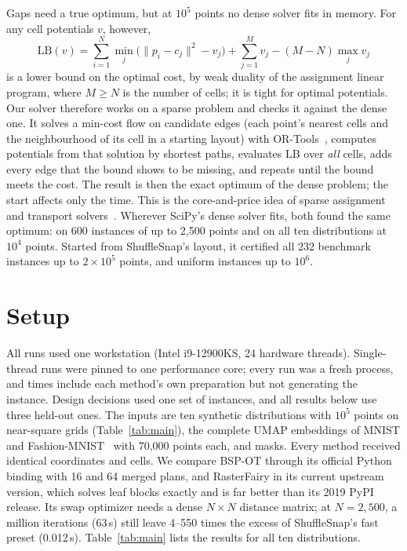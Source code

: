 \documentclass[11pt]{article}
\newcommand{\ShuffleSnap}{ShuffleSnap}
\begin{document}
Gaps need a true optimum, but at $10^5$ points no dense solver fits in memory. For any cell potentials $v$, however,
\[
  \mathrm{LB}(v)=\sum_{i=1}^N \min_j\bigl(\lVert p_i-c_j\rVert^2-v_j\bigr)+\sum_{j=1}^M v_j-(M-N)\max_j v_j
\]
is a lower bound on the optimal cost, by weak duality of the
assignment linear program, where $M\ge N$ is the number of cells; it is tight for optimal
potentials. Our solver therefore works on a sparse problem and checks it against the dense
one. It solves a min-cost flow on candidate edges (each point's nearest cells and the
neighbourhood of its cell in a starting layout) with OR-Tools~\citep{ortools}, computes
potentials from that solution by shortest paths, evaluates $\mathrm{LB}$ over \emph{all}
cells, adds every edge that the bound shows to be missing, and repeats until the bound
meets the cost. The result is then the exact optimum of the dense problem; the start affects
only the time. This is the core-and-price idea of sparse
assignment and transport solvers~\citep{volgenant1996linear,schmitzer2016sparse}. Wherever
SciPy's dense solver fits, both found the same optimum: on 600 instances of up to 2{,}500
points and on all ten distributions at $10^4$ points. Started from \ShuffleSnap's layout, it certified all 232
benchmark instances up to $2\times10^5$ points, and uniform instances up to $10^6$.

\section{Setup}

All runs used one workstation (Intel i9-12900KS, 24 hardware threads). Single-thread runs
were pinned to one performance core; every run was a fresh process, and times include each
method's own preparation but not generating the instance. Design decisions used one set of
instances, and all results below use three held-out ones. The inputs are ten synthetic
distributions with $10^5$ points on near-square grids (Table~\ref{tab:main}), the complete
UMAP embeddings of MNIST and Fashion-MNIST~\citep{xiao2017fashion} with
70{,}000 points each, and masks. Every method received identical coordinates and cells. We
compare BSP-OT through its official Python binding with 16 and 64 merged plans, and
RasterFairy in its current upstream version, which solves leaf blocks exactly and is far
better than its 2019 PyPI release. Its swap optimizer needs a dense $N\times N$ distance
matrix; at $N=2{,}500$, a million iterations (63\,s) still leave 4--550 times the excess of
\ShuffleSnap's fast preset (0.012\,s). Table~\ref{tab:main} lists the results for all ten distributions.
\end{document}
